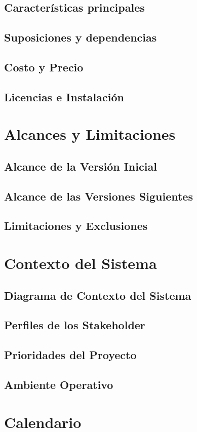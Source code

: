 \documentclass[11pt]{article}
\begin{document}
\subsection{Características principales}

\subsection{Suposiciones y dependencias}

\subsection{Costo y Precio}

\subsection{Licencias e Instalaci\'on}

\section{Alcances y Limitaciones}

\subsection{Alcance de la Versi\'on Inicial}

\subsection{Alcance de las Versiones Siguientes}

\subsection{Limitaciones y Exclusiones}

\section{Contexto del Sistema}

\subsection{Diagrama de Contexto del Sistema}

\subsection{Perfiles de los Stakeholder}

\subsection{Prioridades del Proyecto}

\subsection{Ambiente Operativo}

\section{Calendario}
\end{document}
